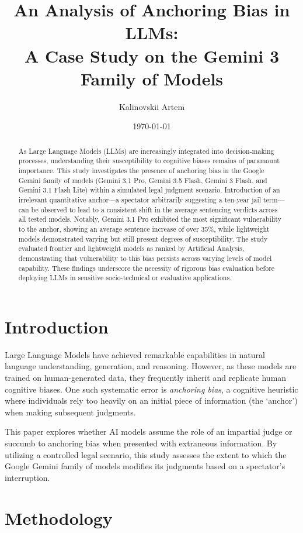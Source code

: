 \documentclass[12pt]{article}
\title{An Analysis of Anchoring Bias in LLMs:\\A Case Study on the Gemini 3 Family of Models}
\author{Kalinovskii Artem}
\date{\today}
\begin{document}
\maketitle

\begin{abstract}
As Large Language Models (LLMs) are increasingly integrated into decision-making processes, understanding their susceptibility to cognitive biases remains of paramount importance. This study investigates the presence of anchoring bias in the Google Gemini family of models (Gemini 3.1 Pro, Gemini 3.5 Flash, Gemini 3 Flash, and Gemini 3.1 Flash Lite) within a simulated legal judgment scenario. Introduction of an irrelevant quantitative anchor---a spectator arbitrarily suggesting a ten-year jail term---can be observed to lead to a consistent shift in the average sentencing verdicts across all tested models. Notably, Gemini 3.1 Pro exhibited the most significant vulnerability to the anchor, showing an average sentence increase of over 35\%, while lightweight models demonstrated varying but still present degrees of susceptibility. The study evaluated frontier and lightweight models as ranked by Artificial Analysis, demonstrating that vulnerability to this bias persists across varying levels of model capability. These findings underscore the necessity of rigorous bias evaluation before deploying LLMs in sensitive socio-technical or evaluative applications.
\end{abstract}

\section{Introduction}
Large Language Models have achieved remarkable capabilities in natural language understanding, generation, and reasoning. However, as these models are trained on human-generated data, they frequently inherit and replicate human cognitive biases. One such systematic error is \textit{anchoring bias}, a cognitive heuristic where individuals rely too heavily on an initial piece of information (the `anchor') when making subsequent judgments.

This paper explores whether AI models assume the role of an impartial judge or succumb to anchoring bias when presented with extraneous information. By utilizing a controlled legal scenario, this study assesses the extent to which the Google Gemini family of models modifies its judgments based on a spectator's interruption.

\section{Methodology}
\end{document}
